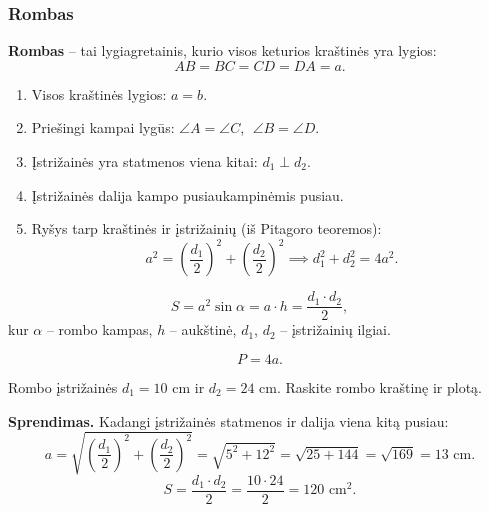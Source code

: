 \subsubsection*{Rombas}

\begin{definition}[Rombas]
\textbf{Rombas} – tai lygiagretainis, kurio visos keturios kraštinės yra lygios:
\[
AB = BC = CD = DA = a.
\]
\end{definition}

\begin{theorem}
\begin{enumerate}
    \item Visos kraštinės lygios: $a = b$.
    \item Priešingi kampai lygūs: $\angle A = \angle C$, $\; \angle B = \angle D$.
    \item Įstrižainės yra statmenos viena kitai: $d_1 \perp d_2$.
    \item Įstrižainės dalija kampo pusiaukampinėmis pusiau.
    \item Ryšys tarp kraštinės ir įstrižainių (iš Pitagoro teoremos):
    \[
    a^2 = \left(\frac{d_1}{2}\right)^2 + \left(\frac{d_2}{2}\right)^2 \implies d_1^2 + d_2^2 = 4a^2.
    \]
\end{enumerate}
\end{theorem}

\begin{tcolorbox}[colback=blue!5!white, colframe=blue!60!black, title=Rombo ploto formulės]
\[
S = a^2 \sin\alpha = a \cdot h = \frac{d_1 \cdot d_2}{2},
\]
kur $\alpha$ – rombo kampas, $h$ – aukštinė, $d_1$, $d_2$ – įstrižainių ilgiai.
\end{tcolorbox}

\begin{tcolorbox}[colback=green!5!white, colframe=green!60!black, title=Rombo perimetras]
\[
P = 4a.
\]
\end{tcolorbox}

\begin{example}
Rombo įstrižainės $d_1 = 10$ cm ir $d_2 = 24$ cm. Raskite rombo kraštinę ir plotą.

\textbf{Sprendimas.} Kadangi įstrižainės statmenos ir dalija viena kitą pusiau:
\[
a = \sqrt{\left(\frac{d_1}{2}\right)^2 + \left(\frac{d_2}{2}\right)^2} = \sqrt{5^2 + 12^2} = \sqrt{25 + 144} = \sqrt{169} = 13 \text{ cm}.
\]
\[
S = \frac{d_1 \cdot d_2}{2} = \frac{10 \cdot 24}{2} = 120 \text{ cm}^2.
\]
\end{example}

